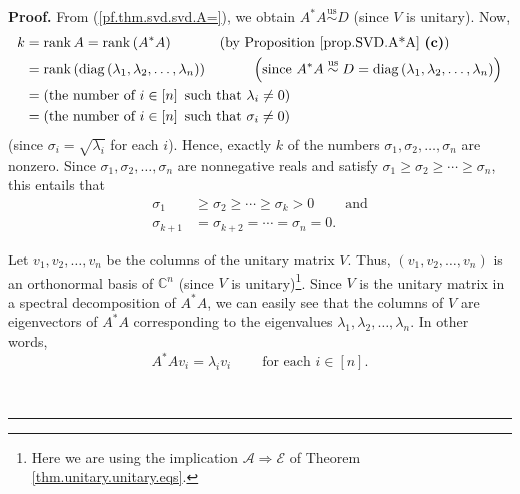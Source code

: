 \documentclass[numbers=enddot,12pt,final,onecolumn,notitlepage]{scrartcl}%
\numberwithin{exer}{subsection}
\theoremstyle{definition}
\newenvironment{proof}[1][Proof]{\noindent\textbf{#1.} }{\ \rule{0.5em}{0.5em}}
\begin{document}
\begin{proof}
From (\ref{pf.thm.svd.svd.A=}), we obtain $A^{\ast}%
A\overset{\operatorname*{us}}{\sim}D$ (since $V$ is unitary). Now,
\begin{align*}
k  &  =\operatorname*{rank}A=\operatorname*{rank}\left(  A^{\ast}A\right)
\ \ \ \ \ \ \ \ \ \ \left(  \text{by Proposition \ref{prop.SVD.A*A}
\textbf{(c)}}\right) \\
&  =\operatorname*{rank}\left(  \operatorname*{diag}\left(  \lambda
_{1},\lambda_{2},\ldots,\lambda_{n}\right)  \right)
\ \ \ \ \ \ \ \ \ \ \left(  \text{since }A^{\ast}A\overset{\operatorname*{us}%
}{\sim}D=\operatorname*{diag}\left(  \lambda_{1},\lambda_{2},\ldots
,\lambda_{n}\right)  \right) \\
&  =\left(  \text{the number of }i\in\left[  n\right]  \text{ such that
}\lambda_{i}\neq0\right) \\
&  =\left(  \text{the number of }i\in\left[  n\right]  \text{ such that
}\sigma_{i}\neq0\right)
\end{align*}
(since $\sigma_{i}=\sqrt{\lambda_{i}}$ for each $i$). Hence, exactly $k$ of
the numbers $\sigma_{1},\sigma_{2},\ldots,\sigma_{n}$ are nonzero. Since
$\sigma_{1},\sigma_{2},\ldots,\sigma_{n}$ are nonnegative reals and satisfy
$\sigma_{1}\geq\sigma_{2}\geq\cdots\geq\sigma_{n}$, this entails that%
\begin{align}
\sigma_{1}  &  \geq\sigma_{2}\geq\cdots\geq\sigma_{k}%
>0\ \ \ \ \ \ \ \ \ \ \text{and}\label{pf.thm.svd.svd.pos}\\
\sigma_{k+1}  &  =\sigma_{k+2}=\cdots=\sigma_{n}=0.
\label{pf.thm.svd.svd.zero}%
\end{align}


Let $v_{1},v_{2},\ldots,v_{n}$ be the columns of the unitary matrix $V$. Thus,
$\left(  v_{1},v_{2},\ldots,v_{n}\right)  $ is an orthonormal basis of
$\mathbb{C}^{n}$ (since $V$ is unitary)\footnote{Here we are using the
implication $\mathcal{A}\Longrightarrow\mathcal{E}$ of Theorem
\ref{thm.unitary.unitary.eqs}.}. Since $V$ is the unitary matrix in a spectral
decomposition of $A^{\ast}A$, we can easily see that the columns of $V$ are
eigenvectors of $A^{\ast}A$ corresponding to the eigenvalues $\lambda
_{1},\lambda_{2},\ldots,\lambda_{n}$. In other words,%
\begin{equation}
A^{\ast}Av_{i}=\lambda_{i}v_{i}\ \ \ \ \ \ \ \ \ \ \text{for each }i\in\left[
n\right]  . \label{pf.thm.svd.svd.evec}%
\end{equation}



\end{proof}
\end{document}
